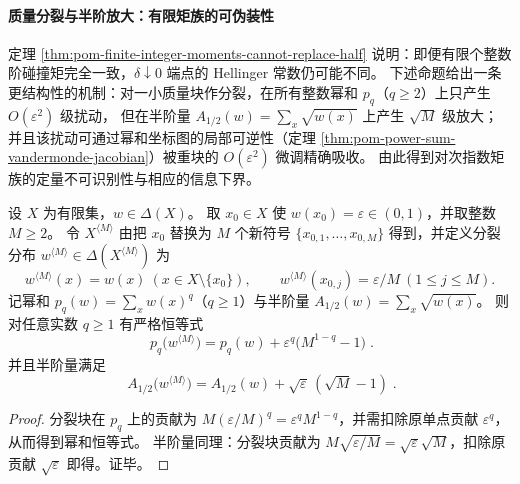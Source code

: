 
\paragraph{质量分裂与半阶放大：有限矩族的可伪装性}
定理 \ref{thm:pom-finite-integer-moments-cannot-replace-half} 说明：即便有限个整数阶碰撞矩完全一致，\(\delta\downarrow 0\) 端点的 Hellinger 常数仍可能不同。
下述命题给出一条更结构性的机制：对一小质量块作分裂，在所有整数幂和 \(p_q\)（\(q\ge 2\)）上只产生 \(O(\varepsilon^2)\) 级扰动，
但在半阶量 \(A_{1/2}(w)=\sum_x\sqrt{w(x)}\) 上产生 \(\sqrt{M}\) 级放大；
并且该扰动可通过幂和坐标图的局部可逆性（定理 \ref{thm:pom-power-sum-vandermonde-jacobian}）被重块的 \(O(\varepsilon^2)\) 微调精确吸收。
由此得到对次指数矩族的定量不可识别性与相应的信息下界。

\begin{proposition}[质量分裂下的幂和变换与半阶根放大]\label{prop:pom-mass-splitting-moment-root-transform}
设 \(X\) 为有限集，\(w\in\Delta(X)\)。
取 \(x_0\in X\) 使 \(w(x_0)=\varepsilon\in(0,1)\)，并取整数 \(M\ge 2\)。
令 \(X^{\langle M\rangle}\) 由把 \(x_0\) 替换为 \(M\) 个新符号 \(\{x_{0,1},\dots,x_{0,M}\}\) 得到，并定义分裂分布 \(w^{\langle M\rangle}\in\Delta(X^{\langle M\rangle})\) 为
\[
w^{\langle M\rangle}(x)=w(x)\ (x\in X\setminus\{x_0\}),\qquad
w^{\langle M\rangle}(x_{0,j})=\varepsilon/M\ (1\le j\le M).
\]
记幂和 \(p_q(w)=\sum_x w(x)^q\)（\(q\ge 1\)）与半阶量 \(A_{1/2}(w)=\sum_x\sqrt{w(x)}\)。
则对任意实数 \(q\ge 1\) 有严格恒等式
\[
\boxed{\;
p_q\!\bigl(w^{\langle M\rangle}\bigr)=p_q(w)+\varepsilon^q\bigl(M^{1-q}-1\bigr)\; }.
\]
并且半阶量满足
\[
\boxed{\;
A_{1/2}\!\bigl(w^{\langle M\rangle}\bigr)=A_{1/2}(w)+\sqrt{\varepsilon}\,(\sqrt{M}-1)\; }.
\]
\end{proposition}
\begin{proof}
分裂块在 \(p_q\) 上的贡献为 \(M(\varepsilon/M)^q=\varepsilon^q M^{1-q}\)，并需扣除原单点贡献 \(\varepsilon^q\)，从而得到幂和恒等式。
半阶量同理：分裂块贡献为 \(M\sqrt{\varepsilon/M}=\sqrt{\varepsilon}\sqrt{M}\)，扣除原贡献 \(\sqrt{\varepsilon}\) 即得。证毕。
\end{proof}

